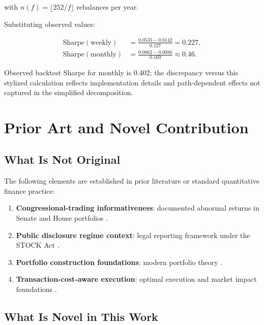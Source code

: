 \documentclass[twocolumn,ieee]{Base_Latex_Template/arithmaxresearch}
\begin{document}
with $n(f) = \lfloor 252 / f \rfloor$ rebalances per year.

Substituting observed values:

\begin{align}
\text{Sharpe}(\text{weekly})
&= \frac{0.0533 - 0.0142}{0.127}
= 0.227, \\
\text{Sharpe}(\text{monthly})
&= \frac{0.0862 - 0.0086}{0.169}
\approx 0.46.
\end{align}

Observed backtest Sharpe for monthly is 0.402; the discrepancy versus this stylized calculation reflects implementation details and path-dependent effects not captured in the simplified decomposition.

\section{Prior Art and Novel Contribution}

\subsection{What Is Not Original}

The following elements are established in prior literature or standard quantitative finance practice:
\begin{enumerate}
\item \textbf{Congressional-trading informativeness}: documented abnormal returns in Senate and House portfolios \cite{ziobrowski2004abnormal, ziobrowski2011house}.
\item \textbf{Public disclosure regime context}: legal reporting framework under the STOCK Act \cite{stock2012stock}.
\item \textbf{Portfolio construction foundations}: modern portfolio theory \cite{markowitz1952portfolio}.
\item \textbf{Transaction-cost-aware execution}: optimal execution and market impact foundations \cite{almgren2001optimal}.
\end{enumerate}

\subsection{What Is Novel in This Work}
\end{document}
